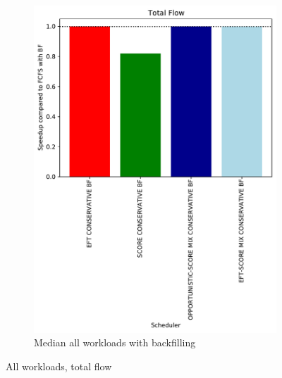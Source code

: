 \documentclass[a4paper]{article}
\begin{document}
\begin{figure}[H]
\begin{subfigure}[b]{0.4\linewidth}\centering\includegraphics[width=1\linewidth]{MBSS/plot/Results_Percentage_FCFS_BF_All_workloads_mediane_Total_flow_450_128_32_256_4_1024.pdf}\caption{Median all workloads with backfilling}\end{subfigure}
\caption{All workloads, total flow}\end{figure}
\end{document}
